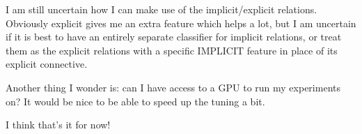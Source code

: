 I am still uncertain how I can make use of the implicit/explicit relations. Obviously explicit gives me an extra feature which helps a lot, but I am uncertain if it is best to have an entirely separate classifier for implicit relations, or treat them as the explicit relations with a specific IMPLICIT feature in place of its explicit connective.

Another thing I wonder is: can I have access to a GPU to run my experiments on? It would be nice to be able to speed up the tuning a bit.

I think that's it for now!
